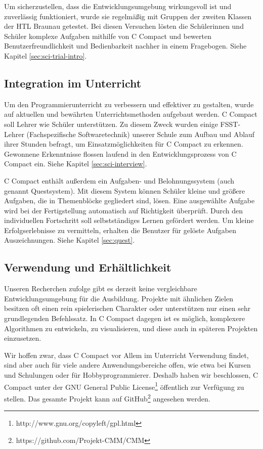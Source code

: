 Um sicherzustellen, dass die Entwicklungsumgebung wirkungsvoll ist und zuverlässig funktioniert, wurde sie regelmäßig mit Gruppen der zweiten Klassen der HTL Braunau getestet. Bei diesen Versuchen lösten die Schülerinnen und Schüler komplexe Aufgaben mithilfe von C Compact und bewerten Benutzerfreundlichkeit und Bedienbarkeit nachher in einem Fragebogen. Siehe Kapitel \ref{sec:sci-trial-intro}.

\subsection*{Integration im Unterricht}
Um den Programmierunterricht zu verbessern und effektiver zu gestalten, wurde auf aktuellen und bewährten Unterrichtsmethoden aufgebaut werden. C Compact soll Lehrer wie Schüler unterstützen. Zu diesem Zweck wurden einige FSST-Lehrer (Fachspezifische Softwaretechnik) unserer Schule zum Aufbau und Ablauf ihrer Stunden befragt, um Einsatzmöglichkeiten für C Compact zu erkennen. Gewonnene Erkenntnisse flossen laufend in den Entwicklungsprozess von C Compact ein. Siehe Kapitel \ref{sec:sci-interview}.

C Compact enthält außerdem ein Aufgaben- und Belohnungssystem (auch genannt Questsystem). Mit diesem System können Schüler kleine und größere Aufgaben, die in Themenblöcke gegliedert sind, lösen. Eine ausgewählte Aufgabe wird bei der Fertigstellung automatisch auf Richtigkeit überprüft. Durch den individuellen Fortschritt soll selbstständiges Lernen gefördert werden. Um kleine Erfolgserlebnisse zu vermitteln, erhalten die Benutzer für gelöste Aufgaben Auszeichnungen. Siehe Kapitel \ref{sec:quest}.

\subsection*{Verwendung und Erhältlichkeit}
Unseren Recherchen zufolge gibt es derzeit keine vergleichbare Entwicklungsumgebung für die Ausbildung. Projekte mit ähnlichen Zielen besitzen oft einen rein spielerischen Charakter oder unterstützen nur einen sehr grundlegenden Befehlssatz. In C Compact dagegen ist es möglich, komplexere Algorithmen zu entwickeln, zu visualisieren, und diese auch in späteren Projekten einzusetzen.

Wir hoffen zwar, dass C Compact vor Allem im Unterricht Verwendung findet, sind aber auch für viele andere Anwendungsbereiche offen, wie etwa bei Kursen und Schulungen oder für Hobbyprogrammierer. Deshalb haben wir beschlossen, C Compact unter der GNU General Public License\footnote{http://www.gnu.org/copyleft/gpl.html} öffentlich zur Verfügung zu stellen. Das gesamte Projekt kann auf GitHub\footnote{https://github.com/Projekt-CMM/CMM} angesehen werden.

